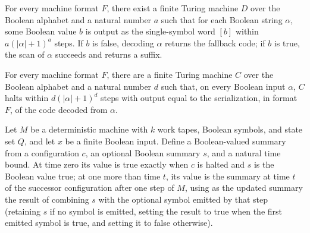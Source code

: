\begin{lemma}
\label{Turing.MachineFormat.exists_canonDecider}
\leanok
{}
For every machine format $F$, there exist a finite Turing machine $D$ over the Boolean
alphabet and a natural number $a$ such that for each Boolean string $\alpha$, some
Boolean value $b$ is output as the single-symbol word $[b]$ within $a(|\alpha|+1)^a$
steps. If $b$ is false, decoding $\alpha$ returns the fallback code; if $b$ is true, the
scan of $\alpha$ succeeds and returns a suffix.
\end{lemma}

\begin{theorem}
\label{Turing.MachineFormat.exists_polyCanonizer}
\leanok
{}
For every machine format $F$, there are a finite Turing machine $C$ over the Boolean
alphabet and a natural number $d$ such that, on every Boolean input $\alpha$, $C$ halts
within $d(|\alpha|+1)^d$ steps with output equal to the serialization, in format $F$, of
the code decoded from $\alpha$.
\end{theorem}

\begin{definition}
\label{Turing.MachineFormat.summaryClock}
\leanok
{}
Let $M$ be a deterministic machine with $k$ work tapes, Boolean symbols, and state set
$Q$, and let $x$ be a finite Boolean input. Define a Boolean-valued summary from a
configuration $c$, an optional Boolean summary $s$, and a natural time bound. At time
zero its value is true exactly when $c$ is halted and $s$ is the Boolean value true; at
one more than time $t$, its value is the summary at time $t$ of the successor
configuration after one step of $M$, using as the updated summary the result of
combining $s$ with the optional symbol emitted by that step (retaining $s$ if no symbol
is emitted, setting the result to true when the first emitted symbol is true, and
setting it to false otherwise).
\end{definition}


